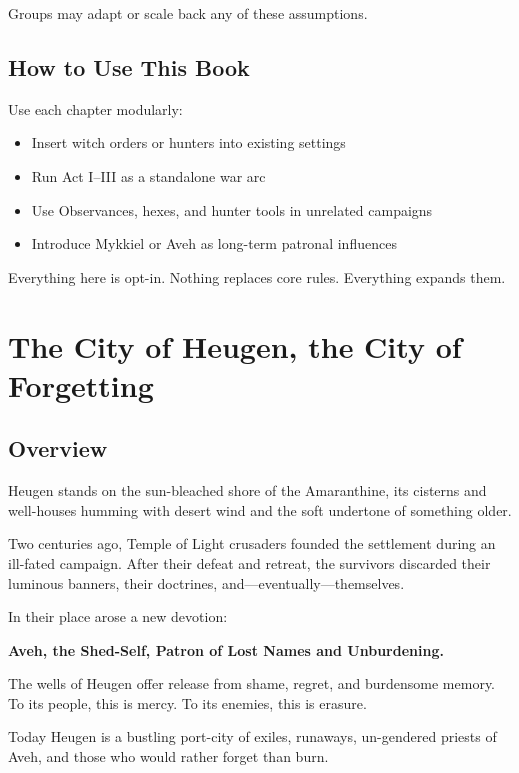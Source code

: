 \documentclass[11pt]{book}
\begin{document}
Groups may adapt or scale back any of these assumptions.

\subsection{How to Use This Book}
Use each chapter modularly:

\begin{itemize}[leftmargin=*]
    \item Insert witch orders or hunters into existing settings  
    \item Run Act I--III as a standalone war arc  
    \item Use Observances, hexes, and hunter tools in unrelated campaigns  
    \item Introduce Mykkiel or Aveh as long-term patronal influences  
\end{itemize}

Everything here is opt-in.  
Nothing replaces core rules.  
Everything expands them.

\section{The City of Heugen, the City of Forgetting}

\subsection{Overview}
Heugen stands on the sun-bleached shore of the Amaranthine, its cisterns and well-houses 
humming with desert wind and the soft undertone of something older.  

Two centuries ago, Temple of Light crusaders founded the settlement during an ill-fated
campaign. After their defeat and retreat, the survivors discarded their luminous banners,
their doctrines, and---eventually---themselves.

In their place arose a new devotion:  
\begin{center}
\textbf{Aveh, the Shed-Self, Patron of Lost Names and Unburdening.}
\end{center}

The wells of Heugen offer release from shame, regret, and burdensome memory.  
To its people, this is mercy.  
To its enemies, this is erasure.

Today Heugen is a bustling port-city of exiles, runaways, un-gendered priests of Aveh,
and those who would rather forget than burn.
\end{document}
